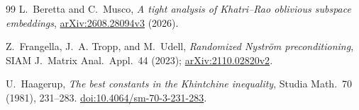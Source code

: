 \documentclass[11pt,a4paper]{article}
\theoremstyle{definition}\newtheorem{definition}[theorem]{Definition}
\theoremstyle{remark}\newtheorem{remark}[theorem]{Remark}
\numberwithin{equation}{section}
\begin{document}
\begin{thebibliography}{99}
L.~Beretta and C.~Musco,
\emph{A tight analysis of Khatri--Rao oblivious subspace embeddings},
\href{https://arxiv.org/abs/2608.28094v3}{arXiv:2608.28094v3} (2026).

Z.~Frangella, J.~A. Tropp, and M.~Udell,
\emph{Randomized Nystr\"om preconditioning},
SIAM J.\ Matrix Anal.\ Appl.\ 44 (2023); \href{https://arxiv.org/abs/2110.02820v2}{arXiv:2110.02820v2}.

U.~Haagerup,
\emph{The best constants in the Khintchine inequality},
Studia Math.\ 70 (1981), 231--283. \href{https://doi.org/10.4064/sm-70-3-231-283}{doi:10.4064/sm-70-3-231-283}.
\end{thebibliography}
\end{document}
